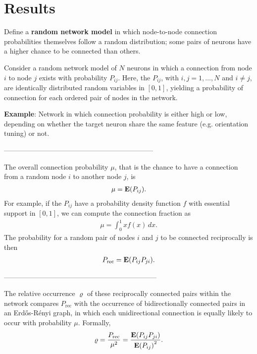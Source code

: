 
\section*{Results}

Define a \textbf{random network model} in which node-to-node connection probabilities themselves follow a random distribution; some pairs of neurons have a higher chance to be connected than others.


Consider a random network model of $N$ neurons in which a connection from node $i$ to node $j$ exists with probability $P_{ij}$.
%
Here, the $P_{ij}$, with $i,j = 1,\dots,N$ and $i \neq j$, are identically distributed random variables in $[0,1]$, yielding a probability of connection for each ordered pair of nodes in the network.

\textbf{\textcolor{gblue}{Example}}: Network in which connection probability is either high or low, depending on whether the target neuron share the same feature (e.g. orientation tuning) or not.

\begin{center}
   -----------------------------------------------------------------
\end{center}

The overall connection probability $\mu$, that is the chance to have a connection from a random node $i$ to another node $j$, is
\begin{align}
\mu = \operatorname{\mathbf{E}}(P_{ij}).
\end{align}
For example, if the $P_{ij}$ have a probability density function $f$ with essential support in $[0,1]$, we can compute the connection fraction as
\begin{align}
  \mu = \int_0^1 x f(x)\,dx.
\end{align}
The probability for a random pair of nodes $i$ and $j$ to be connected reciprocally is then
\begin{align}
P_{\mathrm{rec}} = \operatorname{\mathbf{E}}(P_{ij} P_{ji}).
\end{align}

\begin{center}
  ------------------------------------------------------------------
\end{center}

The relative occurrence $\varrho$ of these reciprocally connected pairs within the network compares $P_{\mathrm{rec}}$ with the occurrence of bidirectionally connected pairs in an Erd\H{o}s-R\'{e}nyi graph, in which each unidirectional connection is equally likely to occur with probability $\mu$. Formally,
\begin{align}
  \varrho = \frac{P_{\mathrm{rec}}}{\mu^2} = \frac{\E\left(P_{ij}P_{ji}\right)}{{\E\left(P_{ij}\right)}^2}.
\end{align}

